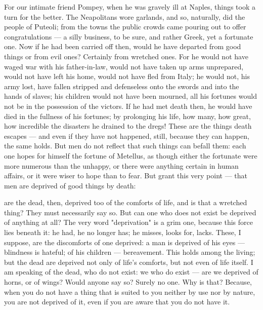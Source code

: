 For our intimate friend Pompey, when he was gravely ill at Naples, things took a turn for the better. The Neapolitans wore garlands, and so, naturally, did the people of Puteoli; from the towns the public crowds came pouring out to offer congratulations — a silly business, to be sure, and rather Greek, yet a fortunate one. Now if he had been carried off then, would he have departed from good things or from evil ones? Certainly from wretched ones. For he would not have waged war with his father-in-law, would not have taken up arms unprepared, would not have left his home, would not have fled from Italy; he would not, his army lost, have fallen stripped and defenseless onto the swords and into the hands of slaves; his children would not have been mourned, all his fortunes would not be in the possession of the victors. If he had met death then, he would have died in the fullness of his fortunes; by prolonging his life, how many, how great, how incredible the disasters he drained to the dregs! These are the things death escapes — and even if they have not happened, still, because they can happen, the same holds. But men do not reflect that such things can befall them: each one hopes for himself the fortune of Metellus, as though either the fortunate were more numerous than the unhappy, or there were anything certain in human affairs, or it were wiser to hope than to fear. But grant this very point — that men are deprived of good things by death:

 are the dead, then, deprived too of the comforts of life, and is that a wretched thing? They must necessarily say so. But can one who does not exist be deprived of anything at all? The very word "deprivation" is a grim one, because this force lies beneath it: he had, he no longer has; he misses, looks for, lacks. These, I suppose, are the discomforts of one deprived: a man is deprived of his eyes — blindness is hateful; of his children — bereavement. This holds among the living; but the dead are deprived not only of life's comforts, but not even of life itself. I am speaking of the dead, who do not exist: we who do exist — are we deprived of horns, or of wings? Would anyone say so? Surely no one. Why is that? Because, when you do not have a thing that is suited to you neither by use nor by nature, you are not deprived of it, even if you are aware that you do not have it.


